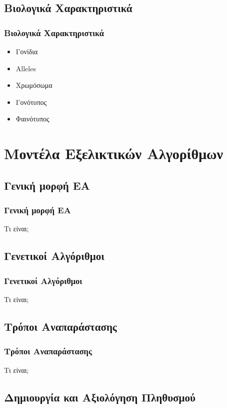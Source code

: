\documentclass[xetex,mathserif,serif,14pt]{beamer}
\begin{document}
\subsection{Βιολογικά Χαρακτηριστικά}

\begin{frame}
\frametitle{Βιολογικά Χαρακτηριστικά}
    \begin{itemize}
      \item Γονίδια
      \item Alleles
      \item Χρωμόσωμα
      \item Γονότυπος
      \item Φαινότυπος
    \end{itemize}
\end{frame}

\section{Μοντέλα Εξελικτικών Αλγορίθμων}

\subsection{Γενική μορφή ΕΑ}

\begin{frame}
\frametitle{Γενική μορφή ΕΑ}
Τι είναι;
\end{frame}

\subsection{Γενετικοί Αλγόριθμοι}

\begin{frame}
\frametitle{Γενετικοί Αλγόριθμοι}
Τι είναι;
\end{frame}

\subsection{Τρόποι Αναπαράστασης}

\begin{frame}
\frametitle{Τρόποι Αναπαράστασης}
Τι είναι;
\end{frame}

\subsection{Δημιουργία και Αξιολόγηση Πληθυσμού}
\end{document}
